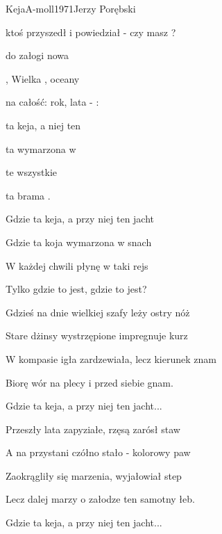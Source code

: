\begin{song}{Keja}{A-moll}{1971}{Jerzy Porębski}{}{}
  \begin{SBVerse}
     ktoś przyszedł i powiedział -  czy masz ?

     do załogi  nowa 

    , Wielka , oceany 

     na całość: rok,  lata - :
  \end{SBVerse}

  \begin{SBChorus}
     ta keja, a  niej ten 

     ta  wymarzona w  

     te wszystkie    

     ta brama  .
  \end{SBChorus}

  \begin{SBChorus}
    Gdzie ta keja, a przy niej ten jacht

    Gdzie ta koja wymarzona w snach

    W każdej chwili płynę w taki rejs

    Tylko gdzie to jest, gdzie to jest?

  \end{SBChorus}

  \begin{SBVerse}
    Gdzieś na dnie wielkiej szafy leży ostry nóż

    Stare dżinsy wystrzępione impregnuje kurz

    W kompasie igła zardzewiała, lecz kierunek znam

    Biorę wór na plecy i przed siebie gnam.
  \end{SBVerse}

  \begin{SBChorus}
    Gdzie ta keja, a przy niej ten jacht...
  \end{SBChorus}

  \begin{SBVerse}
    Przeszły lata zapyziałe, rzęsą zarósł staw

    A na przystani czółno stało - kolorowy paw

    Zaokrągliły się marzenia, wyjałowiał step

    Lecz dalej marzy o załodze ten samotny łeb.
  \end{SBVerse}

  \begin{SBChorus}
    Gdzie ta keja, a przy niej ten jacht...
  \end{SBChorus}
\end{song}
